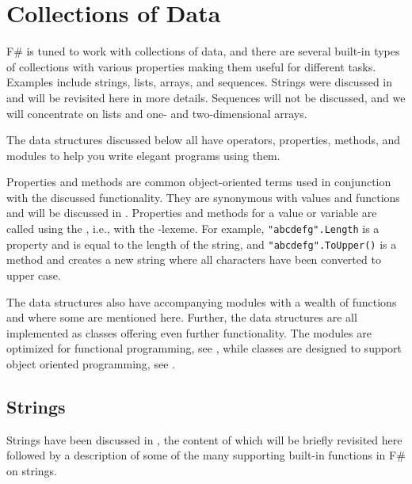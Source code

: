 \chapter{Collections of Data}
\label{chap:lists}
F\# is tuned to work with collections of data, and there are several built-in types of collections with various properties making them useful for different tasks. Examples include strings, lists, arrays, and sequences. Strings were discussed in  and will be revisited here in more details. Sequences will not be discussed, and we will concentrate on lists and one- and two-dimensional arrays.

The data structures discussed below all have operators, properties, methods, and modules to help you write elegant programs using them.

Properties and methods are common object-oriented terms used in conjunction with the discussed functionality. They are synonymous with values and functions and will be discussed in . Properties and methods for a value or variable are called using the , i.e., with the -lexeme. For example, \lstinline{"abcdefg".Length} is a property and is equal to the length of the string, and \lstinline|"abcdefg".ToUpper()| is a method and creates a new string where all characters have been converted to upper case.

The data structures also have accompanying modules with a wealth of functions and where some are mentioned here. Further, the data structures are all implemented as classes offering even further functionality. The modules are optimized for functional programming, see , while classes are designed to support object oriented programming, see .

\section{Strings}
\label{sec:strings}
Strings have been discussed in , the content of which will be briefly revisited here followed by a description of some of the many supporting built-in functions in F\# on strings.

